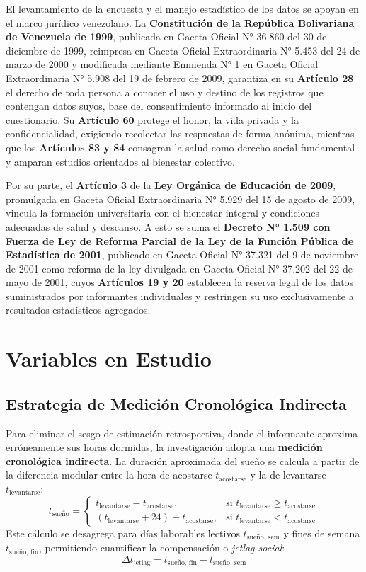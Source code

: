 \documentclass[12pt, letterpaper]{article}
\begin{document}
El levantamiento de la encuesta y el manejo estadístico de los datos se apoyan en el marco jurídico venezolano. La \textbf{Constitución de la República Bolivariana de Venezuela de 1999}, publicada en Gaceta Oficial N° 36.860 del 30 de diciembre de 1999, reimpresa en Gaceta Oficial Extraordinaria N° 5.453 del 24 de marzo de 2000 y modificada mediante Enmienda N° 1 en Gaceta Oficial Extraordinaria N° 5.908 del 19 de febrero de 2009, garantiza en su \textbf{Artículo 28} el derecho de toda persona a conocer el uso y destino de los registros que contengan datos suyos, base del consentimiento informado al inicio del cuestionario. Su \textbf{Artículo 60} protege el honor, la vida privada y la confidencialidad, exigiendo recolectar las respuestas de forma anónima, mientras que los \textbf{Artículos 83 y 84} consagran la salud como derecho social fundamental y amparan estudios orientados al bienestar colectivo.

Por su parte, el \textbf{Artículo 3} de la \textbf{Ley Orgánica de Educación de 2009}, promulgada en Gaceta Oficial Extraordinaria N° 5.929 del 15 de agosto de 2009, vincula la formación universitaria con el bienestar integral y condiciones adecuadas de salud y descanso. A esto se suma el \textbf{Decreto N° 1.509 con Fuerza de Ley de Reforma Parcial de la Ley de la Función Pública de Estadística de 2001}, publicado en Gaceta Oficial N° 37.321 del 9 de noviembre de 2001 como reforma de la ley divulgada en Gaceta Oficial N° 37.202 del 22 de mayo de 2001, cuyos \textbf{Artículos 19 y 20} establecen la reserva legal de los datos suministrados por informantes individuales y restringen su uso exclusivamente a resultados estadísticos agregados.


\section{Variables en Estudio}

\subsection{Estrategia de Medición Cronológica Indirecta}
Para eliminar el sesgo de estimación retrospectiva, donde el informante aproxima erróneamente sus horas dormidas, la investigación adopta una \textbf{medición cronológica indirecta}. La duración aproximada del sueño se calcula a partir de la diferencia modular entre la hora de acostarse $t_{\text{acostarse}}$ y la de levantarse $t_{\text{levantarse}}$:
$$t_{\text{sueño}} =
\begin{cases}
t_{\text{levantarse}} - t_{\text{acostarse}}, & \text{si } t_{\text{levantarse}} \ge t_{\text{acostarse}} \\[0.2cm]
(t_{\text{levantarse}} + 24) - t_{\text{acostarse}}, & \text{si } t_{\text{levantarse}} < t_{\text{acostarse}}
\end{cases}$$
Este cálculo se desagrega para días laborables lectivos $t_{\text{sueño, sem}}$ y fines de semana $t_{\text{sueño, fin}}$, permitiendo cuantificar la compensación o \textit{jetlag social}:
$$\Delta t_{\text{jetlag}} = t_{\text{sueño, fin}} - t_{\text{sueño, sem}}$$
\end{document}
